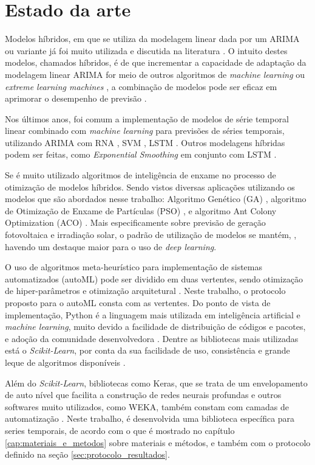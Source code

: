 \chapter{Estado da arte}
\label{cap:estado_da_arte}

Modelos híbridos, em que se utiliza da modelagem linear dada por um ARIMA ou variante já foi muito utilizada e discutida na literatura \cite{zhang2003time, khashei2010artificial, babu2014moving, de2014hybrid, de2016hybrid, domingos2019intelligent}. O intuito destes modelos, chamados híbridos, é de que incrementar a capacidade de adaptação da modelagem linear ARIMA for meio de outros algoritmos de \textit{machine learning} ou \textit{extreme learning machines} \cite{yu2020hybrid}, a combinação de modelos pode ser eficaz em aprimorar o desempenho de previsão \cite{khashei2012new}.

Nos últimos anos, foi comum a implementação de modelos de série temporal linear combinado com \textit{machine learning} para previsões de séries temporais, utilizando ARIMA com RNA \cite{xiong2017hybrid}, SVM \cite{domingos2019intelligent}, LSTM \cite{choi2018stock}. Outros modelagens híbridas podem ser feitas, como \textit{Exponential Smoothing} em conjunto com LSTM \cite{smyl2020hybrid}.

Se é muito utilizado algoritmos de inteligência de enxame no processo de otimização de modelos híbridos. Sendo vistos diversas aplicações utilizando os modelos que são abordados nesse trabalho: Algoritmo Genético (GA) \cite{huang2012hybrid}, algoritmo de Otimização de Enxame de Partículas (PSO) \cite{bagheri2014financial, pradeepkumar2017forecasting}, e algoritmo Ant Colony Optimization (ACO) \cite{shen2013optimal}. Mais especificamente sobre previsão de geração fotovoltaica e irradiação solar, o padrão de utilização de modelos se mantém, \cite{sobri2018solar, wang2019review}, havendo um destaque maior para o uso de \textit{deep learning}.

O uso de algoritmos meta-heurístico para implementação de sistemas automatizados (autoML) pode ser dividido em duas vertentes, sendo otimização de hiper-parâmetros e otimização arquitetural \cite{he2021automl}. Neste trabalho, o protocolo proposto para o autoML consta com as vertentes. Do ponto de vista de implementação, Python é a linguagem mais utilizada em inteligência artificial e \textit{machine learning}, muito devido a facilidade de distribuição de códigos e pacotes, e adoção da comunidade desenvolvedora \cite{blank2020pymoo}. Dentre as bibliotecas mais utilizadas está o \textit{Scikit-Learn}, por conta da sua facilidade de uso, consistência e grande leque de algoritmos disponíveis \cite{scikit-learn, hackeling2017mastering}. 

Além do \textit{Scikit-Learn}, bibliotecas como Keras, que se trata de um envelopamento de auto nível que facilita a construção de redes neurais profundas \cite{jin2019auto} e outros softwares muito utilizados, como WEKA, também constam com camadas de automatização \cite{feurer2020auto}. Neste trabalho, é desenvolvida uma biblioteca específica para series temporais, de acordo com o que é mostrado no capítulo \ref{cap:materiais_e_metodos} sobre materiais e métodos, e também com o protocolo definido na seção \ref{sec:protocolo_resultados}.